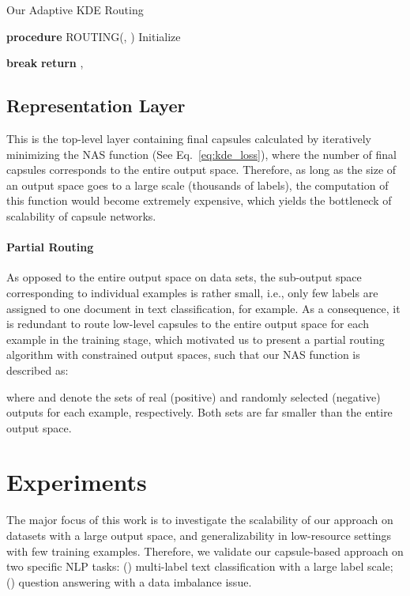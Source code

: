 \documentclass[11pt,a4paper]{article}
\newcommand{\1}{\boldsymbol{1}}
\begin{document}
\begin{algorithm}
\caption{Our Adaptive KDE Routing}\label{alg:1}
\begin{algorithmic}[1]
\State \textbf{procedure} ROUTING(, )
\State Initialize 
  \State 
 \EndFor  
 
  \State 
 \EndFor  

  \State 
 \EndFor 
 
  \State  
 \EndFor
 
 \State 
 \If{}
   \State \textbf{break}
 \Else
   \State 
 \EndIf
\EndWhile
\State \textbf{return} , 
\end{algorithmic}
\end{algorithm}


\subsection{Representation Layer}
This is the top-level layer containing final capsules calculated by iteratively minimizing the NAS function (See Eq.~\ref{eq:kde_loss}), where the number of final capsules corresponds to the entire output space. Therefore,
as long as the size of an output space goes to a large scale (thousands of labels), the computation of this function would become extremely expensive, which yields the bottleneck of scalability of capsule networks.





\paragraph{Partial Routing} As opposed to the entire output space on data sets, the sub-output space corresponding to individual examples is rather small, i.e., only few labels are assigned to one document in text classification, for example. As a consequence, it is 
redundant to route low-level capsules to the entire output space for each example 
in the training stage, which motivated us to
present a partial routing algorithm with constrained output spaces, such that our NAS function is described as:

where  and  denote the sets of real (positive) and randomly selected (negative) outputs for each example, respectively. Both sets are far smaller than the entire output space.



\section{Experiments}\label{sec:setup}
The major focus of this work is to investigate the scalability of our approach on datasets with a large output space, and generalizability in low-resource settings with few training examples. 
Therefore, we validate our capsule-based approach on two specific NLP tasks: () multi-label text classification with a large label scale; () question answering with a data imbalance issue.
\end{document}
